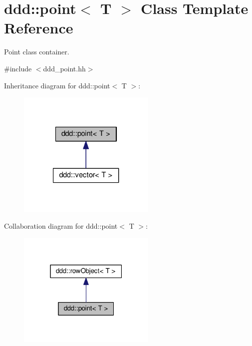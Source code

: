 \hypertarget{classddd_1_1point}{}\section{ddd\+:\+:point$<$ T $>$ Class Template Reference}
\label{classddd_1_1point}


Point class container.  




{\ttfamily \#include $<$ddd\+\_\+point.\+hh$>$}



Inheritance diagram for ddd\+:\+:point$<$ T $>$\+:\nopagebreak
\begin{figure}[H]
\begin{center}
\leavevmode
\includegraphics[width=187pt]{d1/d9e/classddd_1_1point__inherit__graph}
\end{center}
\end{figure}


Collaboration diagram for ddd\+:\+:point$<$ T $>$\+:\nopagebreak
\begin{figure}[H]
\begin{center}
\leavevmode
\includegraphics[width=187pt]{d3/de6/classddd_1_1point__coll__graph}
\end{center}
\end{figure}
